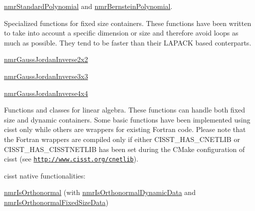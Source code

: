 \begin{DoxyItemize}
\item \hyperlink{classnmr_standard_polynomial}{nmr\-Standard\-Polynomial} and \hyperlink{classnmr_bernstein_polynomial}{nmr\-Bernstein\-Polynomial}.
\item Specialized functions for fixed size containers. These functions have been written to take into account a specific dimension or size and therefore avoid loops as much as possible. They tend to be faster than their L\-A\-P\-A\-C\-K based conterparts. 
\begin{DoxyItemize}
\item \hyperlink{nmr_gauss_jordan_inverse_8h_ab5dda1fde91bd26409f59f9f95a0e1b9}{nmr\-Gauss\-Jordan\-Inverse2x2} 
\item \hyperlink{nmr_gauss_jordan_inverse_8h_aeec861fd603b96fb70b273d08f43988e}{nmr\-Gauss\-Jordan\-Inverse3x3} 
\item \hyperlink{nmr_gauss_jordan_inverse_8h_a62812caf23e8c98ce54b4ecb6496ab4c}{nmr\-Gauss\-Jordan\-Inverse4x4} 
\end{DoxyItemize}
\item Functions and classes for linear algebra. These functions can handle both fixed size and dynamic containers. Some basic functions have been implemented using cisst only while others are wrappers for existing Fortran code. Please note that the Fortran wrappers are compiled only if either C\-I\-S\-S\-T\-\_\-\-H\-A\-S\-\_\-\-C\-N\-E\-T\-L\-I\-B or C\-I\-S\-S\-T\-\_\-\-H\-A\-S\-\_\-\-C\-I\-S\-S\-T\-N\-E\-T\-L\-I\-B has been set during the C\-Make configuration of cisst (see \href{http://www.cisst.org/cnetlib}{\tt http\-://www.\-cisst.\-org/cnetlib}). 
\begin{DoxyItemize}
\item cisst native functionalities\-: 
\begin{DoxyItemize}
\item \hyperlink{nmr_is_orthonormal_8h_acf0ff1e2dbe0c988db04d9db1e2e7697}{nmr\-Is\-Orthonormal} (with \hyperlink{classnmr_is_orthonormal_dynamic_data}{nmr\-Is\-Orthonormal\-Dynamic\-Data} and \hyperlink{classnmr_is_orthonormal_fixed_size_data}{nmr\-Is\-Orthonormal\-Fixed\-Size\-Data}) 
\end{DoxyItemize}



\end{DoxyItemize}
\end{DoxyItemize}
